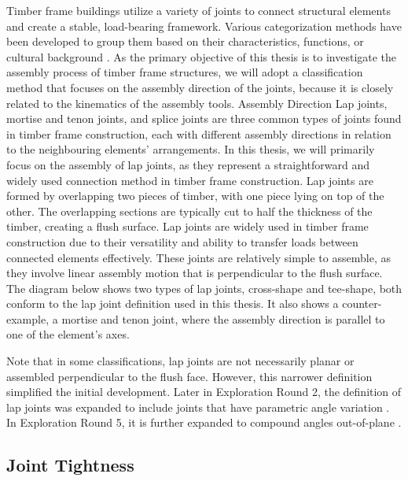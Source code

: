 Timber frame buildings utilize a variety of joints to connect structural elements and create a stable, load-bearing framework. Various categorization methods have been developed to group them based on their characteristics, functions, or cultural background . As the primary objective of this thesis is to investigate the assembly process of timber frame structures, we will adopt a classification method that focuses on the assembly direction of the joints, because it is closely related to the kinematics of the assembly tools.
Assembly Direction
Lap joints, mortise and tenon joints, and splice joints are three common types of joints found in timber frame construction, each with different assembly directions in relation to the neighbouring elements' arrangements. In this thesis, we will primarily focus on the assembly of lap joints, as they represent a straightforward and widely used connection method in timber frame construction. 
Lap joints are formed by overlapping two pieces of timber, with one piece lying on top of the other. The overlapping sections are typically cut to half the thickness of the timber, creating a flush surface. Lap joints are widely used in timber frame construction due to their versatility and ability to transfer loads between connected elements effectively. These joints are relatively simple to assemble, as they involve linear assembly motion that is perpendicular to the flush surface. 
The diagram below shows two types of lap joints, cross-shape and tee-shape, both conform to the lap joint definition used in this thesis. It also shows a counter-example, a mortise and tenon joint, where the assembly direction is parallel to one of the element’s axes. 


Note that in some classifications, lap joints are not necessarily planar or assembled perpendicular to the flush face. However, this narrower definition simplified the initial development. Later in Exploration Round 2, the definition of lap joints was expanded to include joints that have parametric angle variation . In Exploration Round 5, it is further expanded to compound angles out-of-plane . 
\subsection{Joint Tightness}
\label{subsection:exploration-1-joint-tightness}

